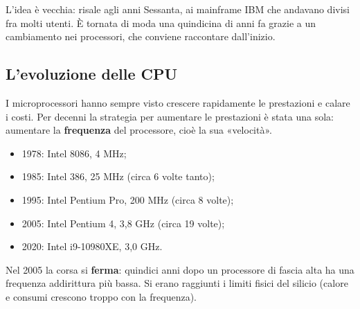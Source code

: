 L'idea è vecchia: risale agli anni Sessanta, ai mainframe IBM che andavano divisi fra molti utenti. È tornata di moda una
quindicina di anni fa grazie a un cambiamento nei processori, che conviene raccontare dall'inizio.

\subsection{L'evoluzione delle CPU}

I microprocessori hanno sempre visto crescere rapidamente le prestazioni e calare i costi. Per decenni la strategia per
aumentare le prestazioni è stata una sola: aumentare la \textbf{frequenza} del processore, cioè la sua «velocità».

\noindent\begin{minipage}[c]{0.42\textwidth}
\begin{itemize}
  \item 1978: Intel 8086, 4 MHz;
  \item 1985: Intel 386, 25 MHz (circa 6 volte tanto);
  \item 1995: Intel Pentium Pro, 200 MHz (circa 8 volte);
  \item 2005: Intel Pentium 4, 3,8 GHz (circa 19 volte);
  \item 2020: Intel i9-10980XE, 3,0 GHz.
\end{itemize}
Nel 2005 la corsa si \textbf{ferma}: quindici anni dopo un processore di fascia alta ha una frequenza addirittura più
bassa. Si erano raggiunti i limiti fisici del silicio (calore e consumi crescono troppo con la frequenza).
\end{minipage}\hfill
\begin{minipage}[c]{0.55\textwidth}
\centering
{}
\end{minipage}

